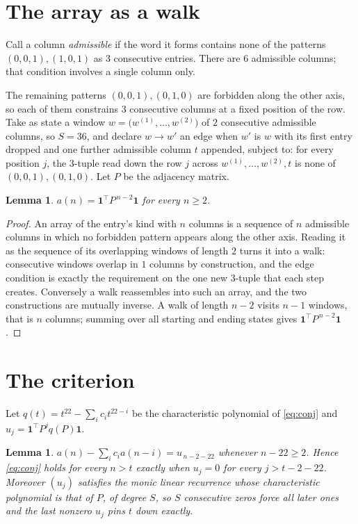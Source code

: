 \documentclass[11pt,a4paper]{article}
\theoremstyle{plain}
\newtheorem{lemma}[theorem]{Lemma}
\theoremstyle{definition}
\begin{document}
\section{The array as a walk}

Call a column \emph{admissible} if the word it forms contains none of the patterns
$(0,0,1), (1,0,1)$ as $3$ consecutive entries. There are $6$ admissible columns; that condition
involves a single column only.

The remaining patterns $(0,0,1), (0,1,0)$ are forbidden along the other axis, so each of them
constrains $3$ consecutive columns at a fixed position of the row. Take as state a
window $w=\bigl(w^{(1)},\dots,w^{(2)}\bigr)$ of $2$ consecutive admissible
columns, so $S=36$, and declare $w\to w'$ an edge when $w'$ is $w$ with its first entry
dropped and one further admissible column $t$ appended, subject to: for every position
$j$, the $3$-tuple read down the row $j$ across $w^{(1)},\dots,w^{(2)},t$
is none of $(0,0,1), (0,1,0)$. Let $P$ be the adjacency matrix.

\begin{lemma}\label{lem:walk}
$a(n)=\mathbf{1}^{\!\top}P^{\,n-2}\mathbf{1}$ for every $n\ge2$.
\end{lemma}

\begin{proof}
An array of the entry's kind with $n$ columns is a sequence of $n$ admissible columns in
which no forbidden pattern appears along the other axis. Reading it as the sequence of its
overlapping windows of length $2$ turns it into a walk: consecutive windows overlap in
$1$ columns by construction, and the edge condition is exactly the requirement on the one
new $3$-tuple that each step creates. Conversely a walk reassembles into such an array,
and the two constructions are mutually inverse. A walk of length $n-2$ visits $n-1$
windows, that is $n$ columns; summing over all starting and ending states gives
$\mathbf{1}^{\!\top}P^{\,n-2}\mathbf{1}$.
\end{proof}

\section{The criterion}

Let $q(t)=t^{22}-\sum_i c_i t^{22-i}$ be the characteristic polynomial of
\eqref{eq:conj} and $u_j=\mathbf{1}^{\!\top}P^{j}q(P)\mathbf{1}$.

\begin{lemma}\label{lem:crit}
$a(n)-\sum_i c_i a(n-i)=u_{\,n-2-22}$ whenever $n-22\ge2$. Hence
\eqref{eq:conj} holds for every $n>t$ exactly when $u_j=0$ for every
$j>t-2-22$. Moreover $(u_j)$ satisfies the monic linear recurrence whose
characteristic polynomial is that of $P$, of degree $S$, so $S$ consecutive zeros force all
later ones and the last nonzero $u_j$ pins $t$ down exactly.
\end{lemma}
\end{document}
